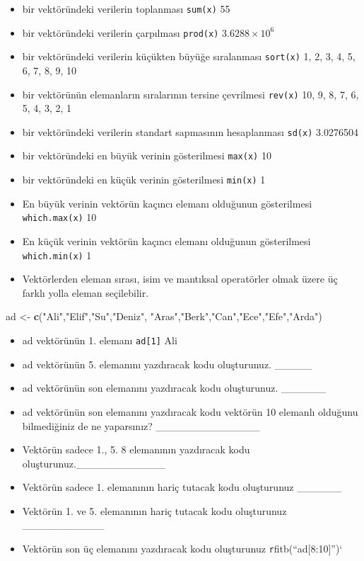 \documentclass[
  oneside]{book}
\newenvironment{Shaded}{\begin{snugshade}}{\end{snugshade}}
\newcommand{\FunctionTok}[1]{\textcolor[rgb]{0.13,0.29,0.53}{\textbf{#1}}}
\newcommand{\NormalTok}[1]{#1}
\newcommand{\OtherTok}[1]{\textcolor[rgb]{0.56,0.35,0.01}{#1}}
\newcommand{\StringTok}[1]{\textcolor[rgb]{0.31,0.60,0.02}{#1}}
\begin{document}
\begin{itemize}
\item
  bir vektöründeki verilerin toplanması \texttt{sum(x)} 55
\item
  bir vektöründeki verilerin çarpılması \texttt{prod(x)} \ensuremath{3.6288\times 10^{6}}
\item
  bir vektöründeki verilerin küçükten büyüğe sıralanması \texttt{sort(x)} 1, 2, 3, 4, 5, 6, 7, 8, 9, 10
\item
  bir vektörünün elemanların sıralarının tersine çevrilmesi \texttt{rev(x)} 10, 9, 8, 7, 6, 5, 4, 3, 2, 1
\item
  bir vektöründeki verilerin standart sapmasının hesaplanması \texttt{sd(x)} 3.0276504
\item
  bir vektöründeki en büyük verinin gösterilmesi \texttt{max(x)} 10
\item
  bir vektöründeki en küçük verinin gösterilmesi \texttt{min(x)} 1
\item
  En büyük verinin vektörün kaçıncı elemanı olduğunun gösterilmesi \texttt{which.max(x)} 10
\item
  En küçük verinin vektörün kaçıncı elemanı olduğunun gösterilmesi \texttt{which.min(x)} 1
\item
  Vektörlerden eleman sırası, isim ve mantıksal operatörler olmak üzere üç farklı yolla eleman seçilebilir.
\end{itemize}

\begin{Shaded}
\begin{Highlighting}[]
\NormalTok{ad  }\OtherTok{\textless{}{-}}  \FunctionTok{c}\NormalTok{(}\StringTok{"Ali"}\NormalTok{,}\StringTok{"Elif"}\NormalTok{,}\StringTok{"Su"}\NormalTok{,}\StringTok{"Deniz"}\NormalTok{,}
\StringTok{"Aras"}\NormalTok{,}\StringTok{"Berk"}\NormalTok{,}\StringTok{"Can"}\NormalTok{,}\StringTok{"Ece"}\NormalTok{,}\StringTok{"Efe"}\NormalTok{,}\StringTok{"Arda"}\NormalTok{)}
\end{Highlighting}
\end{Shaded}

\begin{itemize}
\item
  ad vektörünün 1. elemanı \texttt{ad{[}1{]}} Ali
\item
  ad vektörünün 5. elemanını yazdıracak kodu oluşturunuz. \_\_\_\_\_
\item
  ad vektörünün son elemanını yazdıracak kodu oluşturunuz. \_\_\_\_\_\_
\item
  ad vektörünün son elemanını yazdıracak kodu vektörün 10 elemanlı olduğunu bilmediğiniz de ne yaparsınız? \_\_\_\_\_\_\_\_\_\_\_\_\_\_
\item
  Vektörün sadece 1., 5. 8 elemanının yazdıracak kodu oluşturunuz.\_\_\_\_\_\_\_\_\_\_\_\_
\item
  Vektörün sadece 1. elemanının hariç tutacak kodu oluşturunuz \_\_\_\_\_\_
\item
  Vektörün 1. ve 5. elemanının hariç tutacak kodu oluşturunuz \_\_\_\_\_\_\_\_\_\_\_
\item
  Vektörün son üç elemanını yazdıracak kodu oluşturunuz \texttt{r}fitb(``ad{[}8:10{]}'')`
\end{itemize}
\end{document}
